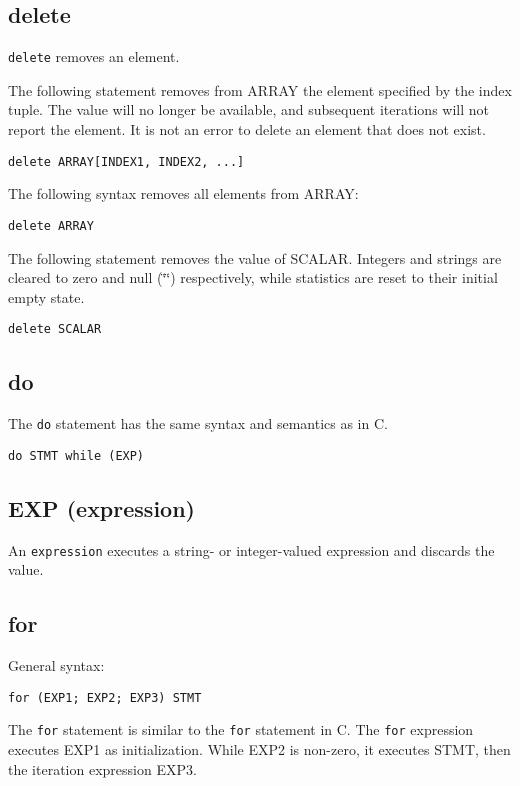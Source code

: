 \documentclass[twoside,english]{article}
\newenvironment{vindent}
{\begin{list}{}{\setlength{\listparindent}{6pt}}
\item[]}
{\end{list}}
\begin{document}
\subsection{delete}
\texttt{delete} removes an element.

The following statement removes from ARRAY the element specified by the index
tuple. The value will no longer be available, and subsequent iterations will
not report the element. It is not an error to delete an element that does
not exist.

\begin{vindent}
\begin{verbatim}
delete ARRAY[INDEX1, INDEX2, ...]
\end{verbatim}
\end{vindent}
The following syntax removes all elements from ARRAY:

\begin{vindent}
\begin{verbatim}
delete ARRAY
\end{verbatim}
\end{vindent}
The following statement removes the value of SCALAR. Integers and strings
are cleared to zero and null (\char`\"{}\char`\"{}) respectively, while statistics
are reset to their initial empty state.

\begin{vindent}
\begin{verbatim}
delete SCALAR
\end{verbatim}
\end{vindent}

\subsection{do}
The \texttt{do} statement has the same syntax and semantics as in C.

\begin{vindent}
\begin{verbatim}
do STMT while (EXP)
\end{verbatim}
\end{vindent}

\subsection{EXP (expression)}
An \texttt{expression} executes a string- or integer-valued expression and
discards the value.


\subsection{for}
General syntax:
\begin{vindent}
\begin{verbatim}
for (EXP1; EXP2; EXP3) STMT
\end{verbatim}
\end{vindent}
The \texttt{for} statement is similar to the \texttt{for} statement in C.
The \texttt{for} expression executes EXP1 as initialization. While EXP2 is
non-zero, it executes STMT, then the iteration expression EXP3.
\end{document}
